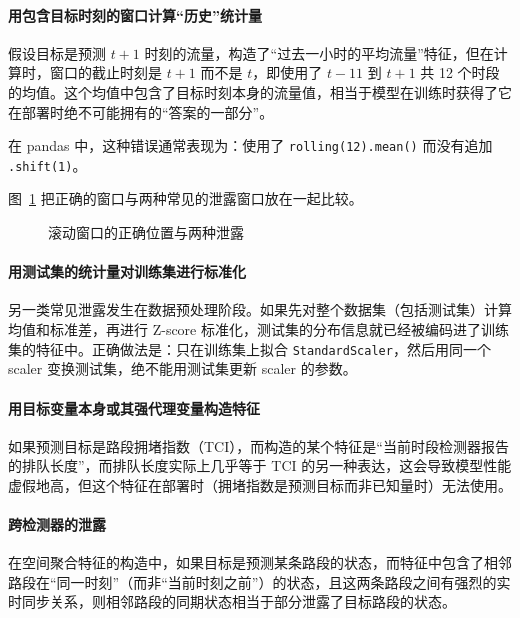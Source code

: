\paragraph{用包含目标时刻的窗口计算“历史”统计量}

假设目标是预测 $t+1$ 时刻的流量，构造了“过去一小时的平均流量”特征，但在计算时，窗口的截止时刻是 $t+1$ 而不是 $t$，即使用了 $t-11$ 到 $t+1$ 共 12 个时段的均值。这个均值中包含了目标时刻本身的流量值，相当于模型在训练时获得了它在部署时绝不可能拥有的“答案的一部分”。

在 pandas 中，这种错误通常表现为：使用了 \texttt{rolling(12).mean()} 而没有追加 \texttt{.shift(1)}。

图~\ref{fig:ch06_leak} 把正确的窗口与两种常见的泄露窗口放在一起比较。

\begin{figure}[H]
  \centering
  \caption{滚动窗口的正确位置与两种泄露}
  \label{fig:ch06_leak}
\end{figure}

\paragraph{用测试集的统计量对训练集进行标准化}

另一类常见泄露发生在数据预处理阶段。如果先对整个数据集（包括测试集）计算均值和标准差，再进行 Z-score 标准化，测试集的分布信息就已经被编码进了训练集的特征中。正确做法是：只在训练集上拟合 \texttt{StandardScaler}，然后用同一个 scaler 变换测试集，绝不能用测试集更新 scaler 的参数。

\paragraph{用目标变量本身或其强代理变量构造特征}

如果预测目标是路段拥堵指数（TCI），而构造的某个特征是“当前时段检测器报告的排队长度”，而排队长度实际上几乎等于 TCI 的另一种表达，这会导致模型性能虚假地高，但这个特征在部署时（拥堵指数是预测目标而非已知量时）无法使用。

\paragraph{跨检测器的泄露}

在空间聚合特征的构造中，如果目标是预测某条路段的状态，而特征中包含了相邻路段在“同一时刻”（而非“当前时刻之前”）的状态，且这两条路段之间有强烈的实时同步关系，则相邻路段的同期状态相当于部分泄露了目标路段的状态。

